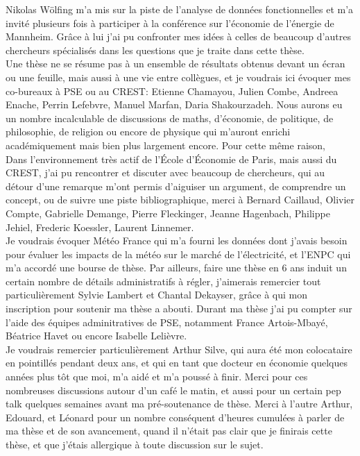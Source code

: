 Nikolas Wölfing m'a mis sur la piste de l'analyse de données fonctionnelles et m'a invité plusieurs fois à participer à la conférence sur l'économie de l'énergie de Mannheim. Grâce à lui j'ai pu confronter mes idées à celles de beaucoup d'autres chercheurs spécialisés dans les questions que je traite dans cette thèse. \\

Une thèse ne se résume pas à un ensemble de résultats obtenus devant un écran ou une feuille, mais aussi à une vie entre collègues, et je voudrais ici évoquer mes co-bureaux à PSE ou au CREST: Etienne Chamayou, Julien Combe, Andreea Enache, Perrin Lefebvre, Manuel Marfan, Daria Shakourzadeh. Nous aurons eu un nombre incalculable de discussions de maths, d'économie, de politique, de philosophie, de religion ou encore de physique qui m'auront enrichi académiquement mais bien plus largement encore. Pour cette même raison, \\

Dans l'environnement très actif de l'École d'Économie de Paris, mais aussi du CREST, j'ai pu rencontrer et discuter avec beaucoup de chercheurs, qui au détour d'une remarque m'ont permis d'aiguiser un argument, de comprendre un concept, ou de suivre une piste bibliographique, merci à Bernard Caillaud, Olivier Compte, Gabrielle Demange, Pierre Fleckinger, Jeanne Hagenbach, Philippe Jehiel, Frederic Koessler, Laurent Linnemer.\\

Je voudrais évoquer Météo France qui m'a fourni les données dont j'avais besoin pour évaluer les impacts de la météo sur le marché de l'électricité, et l'ENPC qui m'a accordé une bourse de thèse. Par ailleurs, faire une thèse en 6 ans induit un certain nombre de détails administratifs à régler, j'aimerais remercier tout particulièrement Sylvie Lambert et Chantal Dekayser, grâce à qui mon inscription pour soutenir ma thèse a abouti. Durant ma thèse j'ai pu compter sur l'aide des équipes adminitratives de PSE, notamment France Artois-Mbayé, Béatrice Havet ou encore Isabelle Lelièvre.\\

Je voudrais remercier particulièrement Arthur Silve, qui aura été mon colocataire en pointillés pendant deux ans, et qui en tant que docteur en économie quelques années plus tôt que moi, m'a aidé et m'a poussé à finir. Merci pour ces nombreuses discussions autour d'un café le matin, et aussi pour un certain pep talk quelques semaines avant ma pré-soutenance de thèse. Merci à l'autre Arthur, Edouard, et Léonard pour un nombre conséquent d'heures cumulées à parler de ma thèse et de son avancement, quand il n'était pas clair que je finirais cette thèse, et que j'étais allergique à toute discussion sur le sujet.\\

